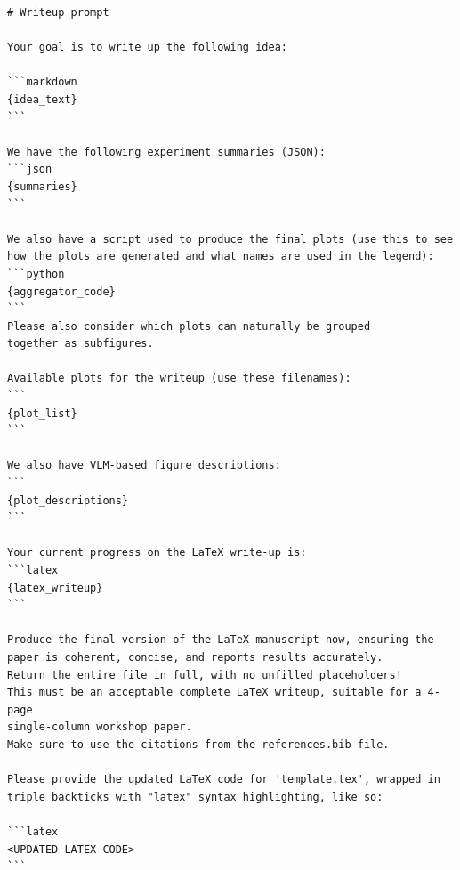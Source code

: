 \documentclass[11pt, a4paper]{include/gdm_format}
\begin{document}
\begin{tcolorbox}[breakable, colback=orange!5!white, colframe=orange!75!black, title=Writeup Prompt (ICBINB workshop specific)]
\begin{verbatim}
# Writeup prompt

Your goal is to write up the following idea:

```markdown
{idea_text}
```

We have the following experiment summaries (JSON):
```json
{summaries}
```

We also have a script used to produce the final plots (use this to see 
how the plots are generated and what names are used in the legend):
```python
{aggregator_code}
```
Please also consider which plots can naturally be grouped 
together as subfigures.

Available plots for the writeup (use these filenames):
```
{plot_list}
```

We also have VLM-based figure descriptions:
```
{plot_descriptions}
```

Your current progress on the LaTeX write-up is:
```latex
{latex_writeup}
```

Produce the final version of the LaTeX manuscript now, ensuring the 
paper is coherent, concise, and reports results accurately.
Return the entire file in full, with no unfilled placeholders!
This must be an acceptable complete LaTeX writeup, suitable for a 4-page 
single-column workshop paper.
Make sure to use the citations from the references.bib file.

Please provide the updated LaTeX code for 'template.tex', wrapped in 
triple backticks with "latex" syntax highlighting, like so:

```latex
<UPDATED LATEX CODE>
```


\end{verbatim}
\end{tcolorbox}
\end{document}
